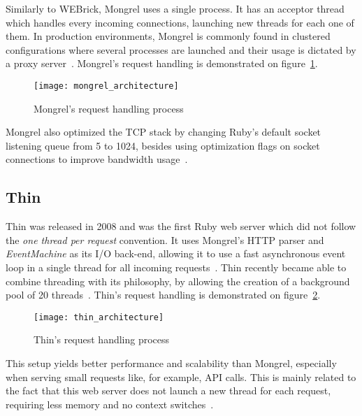 Similarly to WEBrick, Mongrel uses a single process. It has an acceptor thread which handles every incoming connections, launching new threads for each one of them. In production environments, Mongrel is commonly found in clustered configurations where several processes are launched and their usage is dictated by a proxy server~\cite{mongrel_faq}. Mongrel's request handling is demonstrated on figure~\ref{fig:mongrel_architecture}.
\begin{figure}[h]
  \centering
    \texttt{[image: mongrel\_architecture]}
  \caption{Mongrel's request handling process}
  \label{fig:mongrel_architecture}
\end{figure}
Mongrel also optimized the TCP stack by changing Ruby's default socket listening queue from 5 to 1024, besides using optimization flags on socket connections to improve bandwidth usage~\cite{mongrel_faq}.


\subsection{Thin}
Thin was released in 2008 and was the first Ruby web server which did not follow the \textit{one thread per request} convention. It uses Mongrel's HTTP parser and \textit{EventMachine} as its I/O back-end, allowing it to use a fast asynchronous event loop in a single thread for all incoming requests~\cite{thin}. Thin recently became able to combine threading with its philosophy, by allowing the creation of a background pool of 20 threads~\cite{ruby_webservers}. Thin's request handling is demonstrated on figure~\ref{fig:thin_architecture}.
\begin{figure}[h]
  \centering
    \texttt{[image: thin\_architecture]}
  \caption{Thin's request handling process}
  \label{fig:thin_architecture}
\end{figure}
 This setup yields better performance and scalability than Mongrel, especially when serving small requests like, for example, API calls. This is mainly related to the fact that this web server does not launch a new thread for each request, requiring less memory and no context switches~\cite{ruby_webservers}.
 
